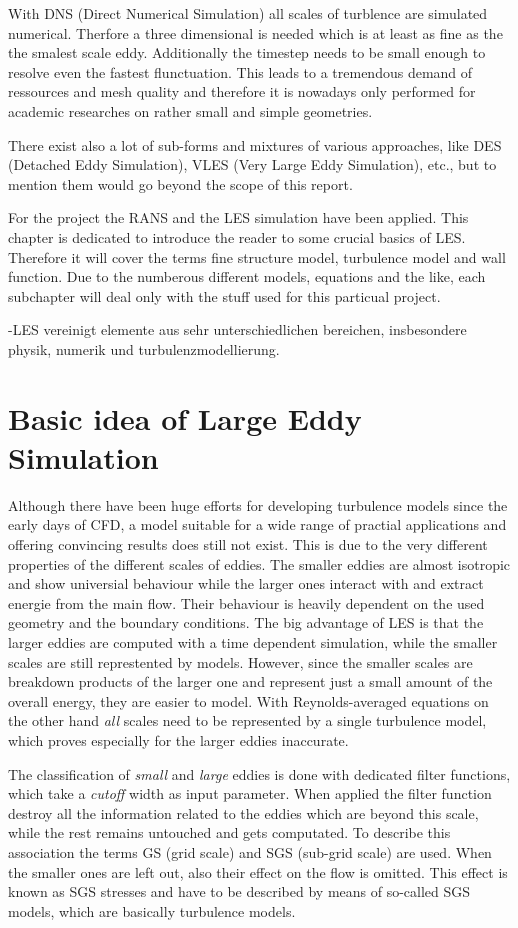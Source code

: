 With DNS (Direct Numerical Simulation) all scales of turblence are simulated numerical. Therfore a three dimensional is needed which is at least as fine as the the smalest scale eddy. Additionally the timestep needs to be small enough to resolve even the fastest flunctuation. This leads to a tremendous demand of ressources and mesh quality and therefore it is nowadays only performed for academic researches on rather small and simple geometries.

There exist also a lot of sub-forms and mixtures of various approaches, like DES (Detached Eddy Simulation), VLES (Very Large Eddy Simulation), etc., but to mention them would go beyond the scope of this report.

For the project the RANS and the LES simulation have been applied. This chapter is dedicated to introduce the reader to some crucial basics of LES. Therefore it will cover the terms fine structure model, turbulence model and wall function. Due to the numberous different models, equations and the like, each subchapter will deal only with the stuff used for this particual project.

-LES vereinigt elemente aus sehr unterschiedlichen bereichen, insbesondere physik, numerik und turbulenzmodellierung.
\section{Basic idea of Large Eddy Simulation}
Although there have been huge efforts for developing turbulence models since the early days of CFD, a model suitable for a wide range of practial applications and offering convincing results does still not exist. This is due to the very different properties of the different scales of eddies. The smaller eddies are almost isotropic and show universial behaviour while the larger ones interact with and extract energie from the main flow. Their behaviour is heavily dependent on the used geometry and the boundary conditions.
The big advantage of LES is that the larger eddies are computed with a time dependent simulation, while the smaller scales are still represtented by models. However, since the smaller scales are breakdown products of the larger one and represent just a small amount of the overall energy, they are easier to model. With Reynolds-averaged equations on the other hand \emph{all} scales need to be represented by a single turbulence model, which proves especially for the larger eddies inaccurate.

The classification of \emph{small} and \emph{large} eddies is done with dedicated filter functions, which take a \emph{cutoff} width as input parameter. When applied the filter function destroy all the information related to the eddies which are beyond this scale, while the rest remains untouched and gets computated. To describe this association the terms GS (grid scale) and SGS (sub-grid scale) are used. When the smaller ones are left out, also their effect on the flow is omitted. This effect is known as SGS stresses and have to be described by means of so-called SGS models, which are basically turbulence models.

